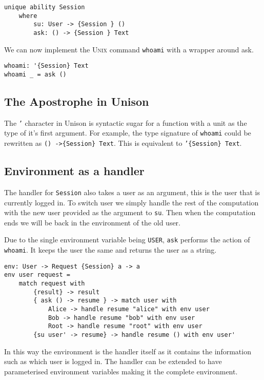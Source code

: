 \documentclass[logo,bsc,singlespacing,parskip]{infthesis}
\begin{document}
\begin{lstlisting}[language=unison]
unique ability Session
    where
        su: User -> {Session } ()
        ask: () -> {Session } Text
\end{lstlisting}

We can now implement the \textsc{Unix} command \texttt{whoami} with a wrapper
around ask.

\begin{lstlisting}[language=unison]
whoami: '{Session} Text
whoami _ = ask ()
\end{lstlisting}

\subsection{The Apostrophe in Unison}

The \texttt{'} character in Unison is syntactic sugar for a function with a
unit as the type of it's first argument. For example, the type signature of 
\texttt{whoami} could be rewritten as \texttt{() ->\{Session\} Text}. This is 
equivalent to \texttt{'\{Session\} Text}.

\subsection{Environment as a handler}

The handler for \texttt{Session} also takes a user as an argument, this is the
user that is currently logged in. To switch user we simply handle the rest of
the computation with the new user provided as the argument to \texttt{su}. Then
when the computation ends we will be back in the environment of the old user.

Due to the single environment variable being \texttt{USER}, \texttt{ask}
performs the action of \texttt{whoami}. It keeps the user the same and returns
the user as a string.

\begin{lstlisting}[language=unison]
env: User -> Request {Session} a -> a
env user request = 
    match request with
        {result} -> result
        { ask () -> resume } -> match user with 
            Alice -> handle resume "alice" with env user
            Bob -> handle resume "bob" with env user
            Root -> handle resume "root" with env user
        {su user' -> resume} -> handle resume () with env user'
\end{lstlisting}

In this way the environment is the handler itself as it contains the
information such as which user is logged in. The handler can be extended to
have parameterised environment variables making it the complete environment.
\end{document}
